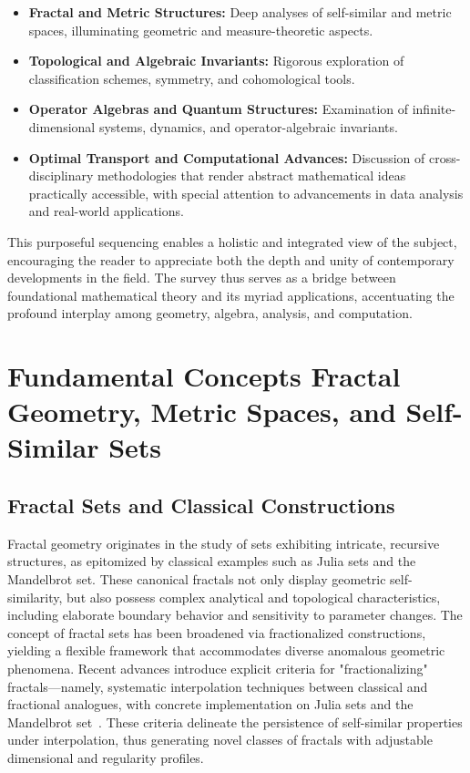 \begin{itemize}
    \item \textbf{Fractal and Metric Structures:} Deep analyses of self-similar and metric spaces, illuminating geometric and measure-theoretic aspects.
    \item \textbf{Topological and Algebraic Invariants:} Rigorous exploration of classification schemes, symmetry, and cohomological tools.
    \item \textbf{Operator Algebras and Quantum Structures:} Examination of infinite-dimensional systems, dynamics, and operator-algebraic invariants.
    \item \textbf{Optimal Transport and Computational Advances:} Discussion of cross-disciplinary methodologies that render abstract mathematical ideas practically accessible, with special attention to advancements in data analysis and real-world applications.
\end{itemize}

This purposeful sequencing enables a holistic and integrated view of the subject, encouraging the reader to appreciate both the depth and unity of contemporary developments in the field. The survey thus serves as a bridge between foundational mathematical theory and its myriad applications, accentuating the profound interplay among geometry, algebra, analysis, and computation.

\section{Fundamental Concepts Fractal Geometry, Metric Spaces, and Self-Similar Sets}

\subsection{Fractal Sets and Classical Constructions}

Fractal geometry originates in the study of sets exhibiting intricate, recursive structures, as epitomized by classical examples such as Julia sets and the Mandelbrot set. These canonical fractals not only display geometric self-similarity, but also possess complex analytical and topological characteristics, including elaborate boundary behavior and sensitivity to parameter changes. The concept of fractal sets has been broadened via fractionalized constructions, yielding a flexible framework that accommodates diverse anomalous geometric phenomena. Recent advances introduce explicit criteria for "fractionalizing" fractals—namely, systematic interpolation techniques between classical and fractional analogues, with concrete implementation on Julia sets and the Mandelbrot set~\cite{ref106}. These criteria delineate the persistence of self-similar properties under interpolation, thus generating novel classes of fractals with adjustable dimensional and regularity profiles.

